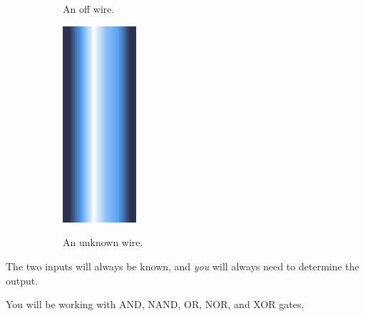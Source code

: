 \documentclass[12pt]{book}
\begin{document}
\begin{figure}[h]
\begin{subfigure}[t]{0.3\textwidth}
				An off wire.
			\end{subfigure}
			\hspace{1mm}
			\begin{subfigure}[t]{0.3\textwidth}
				\centering
				\includegraphics[width=0.3\textwidth]{UNKNOWN}

				An unknown wire.
			\end{subfigure}
		\end{figure}

		The two inputs will always be known, and \emph{you} will always need to determine the output.

		You will be working with AND, NAND, OR, NOR, and XOR gates.
\end{document}
